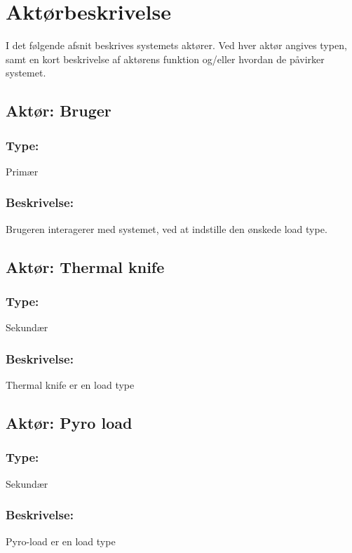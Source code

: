 

\section{Aktørbeskrivelse}
I det følgende afsnit beskrives systemets aktører. Ved hver aktør angives typen, samt en kort beskrivelse af aktørens funktion og/eller hvordan de påvirker systemet.

\begin{framed}
	\subsection{Aktør: Bruger}
	\subsubsection*{Type:}
		Primær
	
	\subsubsection*{Beskrivelse:}
		Brugeren interagerer med systemet, ved at indstille den ønskede load type.
\end{framed}

\begin{framed}
	\subsection{Aktør: Thermal knife}
	\subsubsection*{Type:}
	Sekundær
	
	\subsubsection*{Beskrivelse:}
	Thermal knife er en load type
\end{framed}

\begin{framed}
	\subsection{Aktør: Pyro load}
	\subsubsection*{Type:}
	Sekundær
	
	\subsubsection*{Beskrivelse:}
	Pyro-load er en load type
\end{framed}

